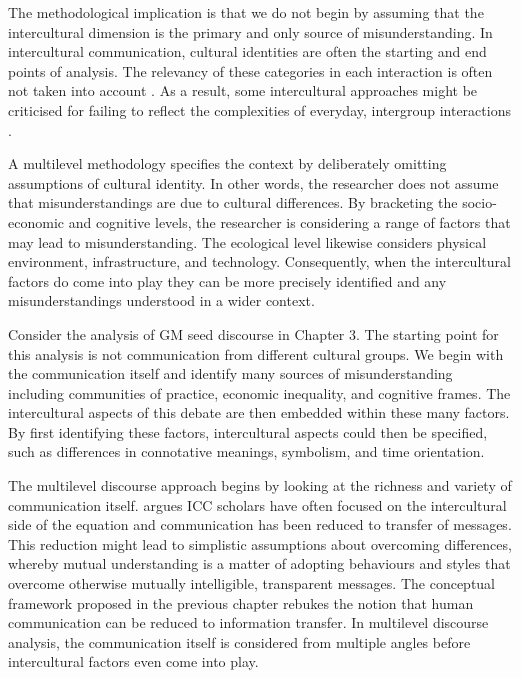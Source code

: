 The methodological implication is that we do not begin by assuming that the intercultural dimension is the primary and only source of misunderstanding. In intercultural communication, cultural identities are often the starting and end points of analysis. The relevancy of these categories in each interaction is often not taken into account \citep{Nishizaka1999,Nishizaka1995}. As a result, some intercultural approaches might be criticised for failing to reflect the complexities of everyday, intergroup interactions \citep{Frame2014}.

A multilevel methodology specifies the context by deliberately omitting assumptions of cultural identity. In other words, the researcher does not assume that misunderstandings are due to cultural differences. By bracketing the socio-economic and cognitive levels, the researcher is considering a range of factors that may lead to misunderstanding. The ecological level likewise considers physical environment, infrastructure, and technology. Consequently, when the intercultural factors do come into play they can be more precisely identified and any misunderstandings understood in a wider context. 

Consider the analysis of GM seed discourse in Chapter 3. The starting point for this analysis is not communication from different cultural groups. We begin with the communication itself and identify many sources of misunderstanding including communities of practice, economic inequality, and cognitive frames. The intercultural aspects of this debate are then embedded within these many factors. By first identifying these factors, intercultural aspects could then be specified, such as differences in connotative meanings, symbolism, and time orientation.

The multilevel discourse approach begins by looking at the richness and variety of communication itself. \cite{Dacheux} argues ICC scholars have often focused on the intercultural side of the equation and communication has been reduced to transfer of messages. This reduction might lead to simplistic assumptions about overcoming differences, whereby mutual understanding is a matter of adopting behaviours and styles that overcome otherwise mutually intelligible, transparent messages. The conceptual framework proposed in the previous chapter rebukes the notion that human communication can be reduced to information transfer. In multilevel discourse analysis, the communication itself is considered from multiple angles before intercultural factors even come into play. 

